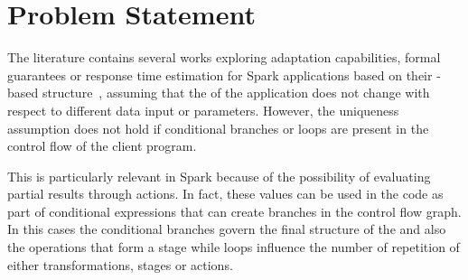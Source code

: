 \section{Problem Statement}\label{sec:problem_statement}

The literature contains several works exploring adaptation capabilities, formal guarantees or response time estimation for Spark applications based on their \plan-based structure~\cite{dSpark, xsparkreport, Quattrocchi2018}, assuming that the \plan of the application does not change with respect to different data input or parameters. However, the \plan uniqueness assumption does not hold if conditional branches or loops are present in the control flow of the client program.

This is particularly relevant in Spark because of the possibility of evaluating
partial results through actions. In fact, these values can be used in the code as part of conditional expressions that can create branches in the control flow graph. In this cases the conditional branches govern the final structure of the \plan and also the operations that form a stage while loops influence the number of repetition of either transformations, stages or actions. 


